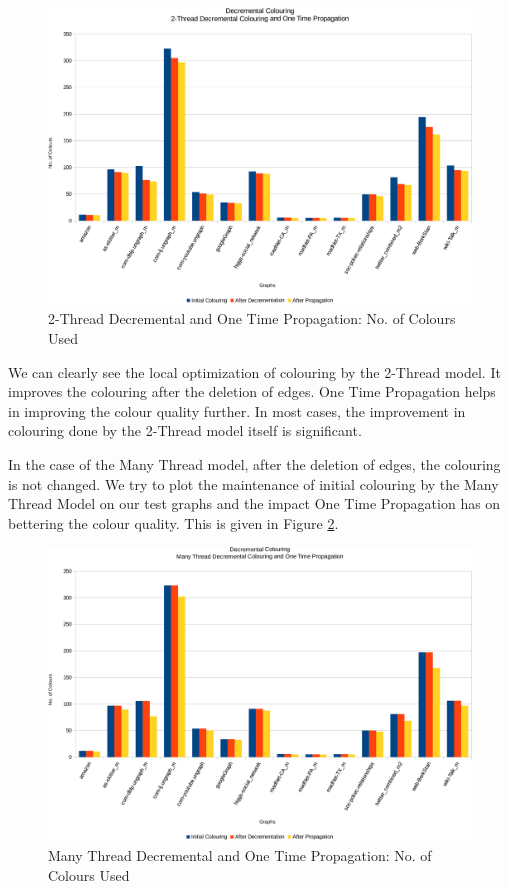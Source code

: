 \documentclass[MTech]{iitmdiss}
\begin{document}
\begin{figure}[h]
    \centering
    \includegraphics[width=\textwidth,keepaspectratio=true]{chartNewest12.pdf}
    \caption{
        2-Thread Decremental and One Time Propagation: No. of Colours Used
    }
    \label{fig:chart23}
\end{figure}

We can clearly see the local optimization of colouring by the 2-Thread model. It improves the colouring after the deletion of edges. One Time Propagation helps in improving the colour quality further. In most cases, the improvement in colouring done by the 2-Thread model itself is significant.

In the case of the Many Thread model, after the deletion of edges, the colouring is not changed. We try to plot the maintenance of initial colouring by the Many Thread Model on our test graphs and the impact One Time Propagation has on bettering the colour quality. This is given in Figure \ref{fig:chart24}.

\begin{figure}[h]
    \centering
    \includegraphics[width=\textwidth,keepaspectratio=true]{chartNewest14.pdf}
    \caption{
        Many Thread Decremental and One Time Propagation: No. of Colours Used
    }
    \label{fig:chart24}
\end{figure}
\end{document}
